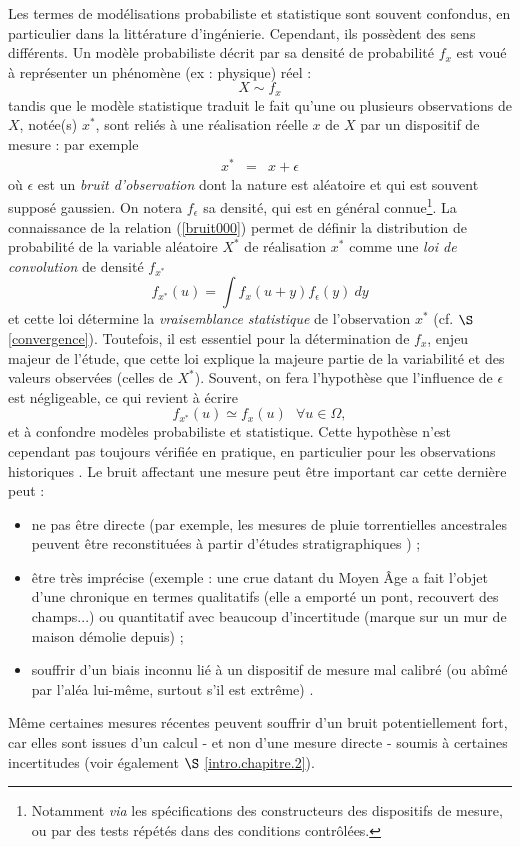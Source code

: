 Les termes de mod\'elisations probabiliste et statistique sont souvent confondus, en particulier dans la litt\'erature d'ing\'enierie.
Cependant, ils poss\`edent des sens diff\'erents. Un mod\`ele probabiliste d\'ecrit par sa densit\'e de probabilit\'e $f_x$ est vou\'e \`a repr\'esenter un  ph\'enom\`ene (ex : physique) r\'eel :
$$
X \sim f_x
$$
tandis que le mod\`ele statistique traduit le fait qu'une ou plusieurs observations de $X$, not\'ee(s) $x^*$, sont reli\'es \`a une r\'ealisation r\'eelle $x$ de $X$ par un dispositif de mesure  : par exemple
\begin{eqnarray}
x^* & = & x + \epsilon \label{bruit000}
\end{eqnarray}
o\`u $\epsilon$ est un {\it bruit d'observation} dont la nature est al\'eatoire  et qui est souvent suppos\'e gaussien. On notera $f_{\epsilon}$ sa densit\'e, qui est en g\'en\'eral connue\footnote{Notamment {\it via} les sp\'ecifications des constructeurs des dispositifs de mesure, ou par des tests r\'ep\'et\'es dans des conditions contr\^ol\'ees.}. La connaissance de la relation (\ref{bruit000}) permet de d\'efinir la distribution de probabilit\'e de la variable al\'eatoire $X^*$ de r\'ealisation $x^*$ comme une {\it loi de convolution}  de densit\'e $f_{x^*}$
$$
f_{x^*}(u) = \int f_x(u + y) f_{\epsilon}(y) \ dy
$$
et cette loi d\'etermine la {\it vraisemblance statistique} de l'observation $x^*$ (cf. $\S$ \ref{convergence}). 
Toutefois, il est essentiel pour la d\'etermination de $f_x$, enjeu majeur de l'\'etude, que cette loi explique la majeure partie de la variabilit\'e et des valeurs observ\'ees (celles de $X^*$). Souvent, on fera l'hypoth\`ese que l'influence de $\epsilon$ est n\'egligeable, ce qui revient \`a \'ecrire
$$
f_{x^*}(u) \simeq f_x(u) \ \ \ \forall u \in \Omega,
$$
et \`a confondre mod\`eles probabiliste et statistique. Cette hypoth\`ese n'est cependant pas toujours v\'erifi\'ee en pratique, en particulier pour les observations historiques \cite{Reis2005}. Le bruit affectant une mesure peut \^etre important car cette derni\`ere peut :
\begin{itemize}
\item ne pas \^etre directe (par exemple, les mesures de pluie torrentielles ancestrales peuvent \^etre reconstitu\'ees \`a partir d'\'etudes stratigraphiques \cite{Galevski1955}) ;
\item \^etre tr\`es impr\'ecise (exemple : une crue datant du Moyen \^Age a fait l'objet d'une chronique en termes qualitatifs (elle a emport\'e un pont, recouvert des champs...) ou quantitatif avec beaucoup d'incertitude (marque sur un mur de maison d\'emolie depuis) \cite{Coeur2000,Payrastre2003} ;
\item souffrir d'un biais inconnu li\'e \`a un dispositif de mesure mal calibr\'e (ou ab\^im\'e par l'al\'ea lui-m\^eme, surtout s'il est extr\^eme) \cite{FSA-007}.
\end{itemize} 
M\^eme certaines mesures r\'ecentes peuvent souffrir d'un bruit potentiellement fort, car elles sont issues d'un calcul - et non d'une mesure directe - soumis \`a certaines incertitudes (voir \'egalement $\S$ \ref{intro.chapitre.2}). \\



